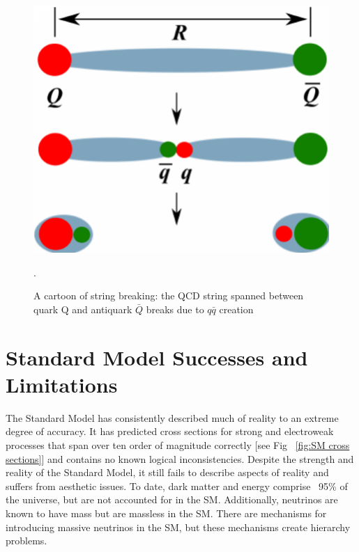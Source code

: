 \begin{figure}[h!]
  \centering
  \includegraphics[width=\hsize]{figures/Theory/color_string.pdf}
  \caption{A cartoon of string breaking: the QCD string spanned between quark Q and antiquark $\bar{Q}$ breaks due to $q\bar{q}$ creation \cite{colorstring}}.
  \label{fig:colorstring}
\end{figure}
\FloatBarrier

\chapter{Standard Model Successes and Limitations}
The Standard Model has consistently described much of reality to an extreme degree of accuracy. It has predicted cross sections for strong and electroweak processes that span over ten order of magnitude correctly [see Fig ~\ref{fig:SM cross sections}] and contains no known logical inconsistencies. Despite the strength and reality of the Standard Model, it still fails to describe aspects of reality and suffers from aesthetic issues. 
To date, dark matter and energy comprise ~95\% of the universe, but are not accounted for in the SM. Additionally, neutrinos are known to have mass but are massless in the SM. There are mechanisms for introducing massive neutrinos in the SM, but these mechanisms create hierarchy problems. 

